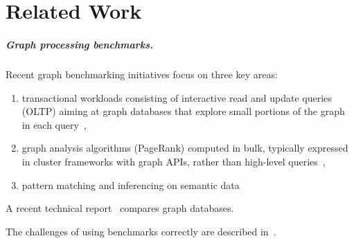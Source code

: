 \chapter{Related Work}
\label{section:related-work}


\paragraph*{Graph processing benchmarks.}

Recent graph benchmarking initiatives focus on three key areas:

\begin{enumerate}
\item transactional workloads consisting of interactive read and update queries (OLTP) aiming at graph databases that explore small portions of the graph in each query~\cite{DBLP:conf/cidr/BarahmandG13,DBLP:conf/sigmod/ArmstrongPBC13,DBLP:journals/ase/DayarathnaS14,DBLP:conf/sigmod/ErlingALCGPPB15},
\item graph analysis algorithms (\eg PageRank) computed in bulk, typically expressed in cluster frameworks with graph APIs, rather than high-level queries~\cite{DBLP:conf/hipc/BaderM05,DBLP:conf/bigdataconf/ElserM13,DBLP:conf/sc/NaiXTKL15,DBLP:journals/pvldb/IosupHNHPMCCSAT16},
\item pattern matching and inferencing on semantic data~\cite{DBLP:journals/ws/GuoPH05,DBLP:books/sp/virgilio09/SchmidtHMPL09,DBLP:conf/semweb/MorseyLAN11,DBLP:conf/semweb/AlucHOD14,TrainBenchmarkSOSYM}
\end{enumerate}

A recent technical report~\cite{lissandrini17} compares graph databases.

The challenges of using benchmarks correctly are described in~\cite{DBLP:conf/sigmod/RaasveldtHGM18}.




